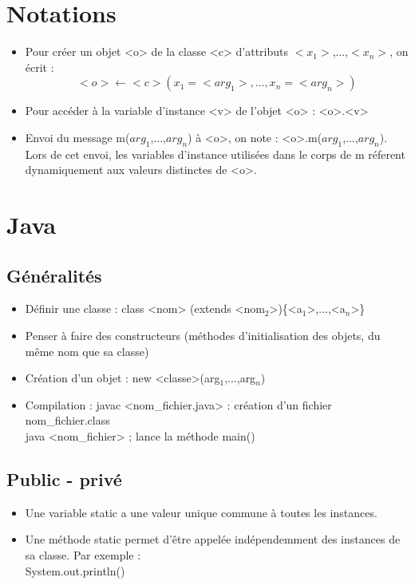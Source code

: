 \section{Notations}
\begin{itemize}
\item Pour créer un objet <o> de la classe <c> d'attributs $<x_1>$,...,$<x_n>$, on écrit : 
\[<o>\leftarrow <c>(x_1=<arg_1>,...,x_n=<arg_n>)\]
\item Pour accéder à la variable d'instance <v> de l'objet <o> : <o>.<v>
\item Envoi du message m($arg_1$,...,$arg_n$) à <o>, on note : <o>.m($arg_1$,...,$arg_n$). Lors de cet envoi, les variables d'instance utilisées dans le corps de m réferent 
dynamiquement aux valeurs distinctes de <o>.
\end{itemize}

\section{Java}
\subsection{Généralités}
\begin{itemize}
\item Définir une classe : class <nom> (extends <nom$_2$>)\{<a$_1$>,...,<a$_n$>\}
\item Penser à faire des constructeurs (méthodes d'initialisation des objets, du même nom que sa classe)
\item Création d'un objet : new <classe>(arg$_1$,...,arg$_n$)
\item Compilation : javac <nom\_fichier.java> : création d'un fichier nom\_fichier.class \\
java <nom\_fichier> ; lance la méthode main()
\end{itemize}

\subsection{Public - privé}
\begin{itemize}
	\item Une variable static a une valeur unique commune à toutes les instances.
	\item Une méthode static permet d'être appelée indépendemment des instances de sa classe. Par exemple : \\ System.out.println()
\end{itemize}

